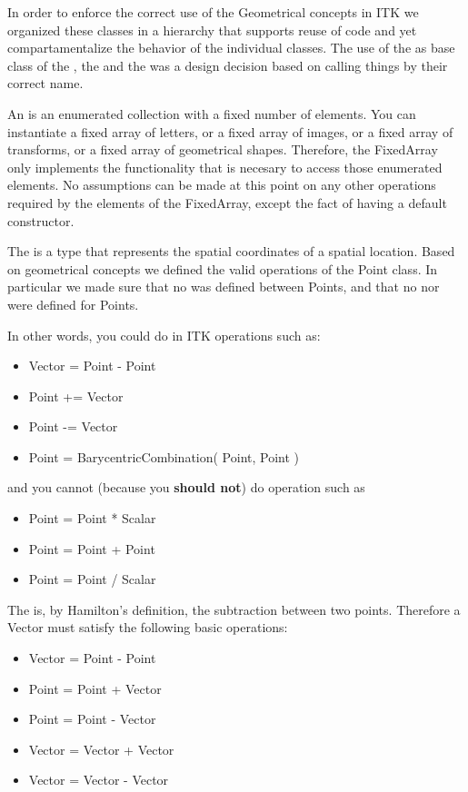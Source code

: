 In order to enforce the correct use of the Geometrical concepts in ITK we
organized these classes in a hierarchy that supports reuse of code and yet
compartamentalize the behavior of the individual classes.  The use of the
 as base class of the , the 
and the  was a design decision based on calling things
by their correct name.

An  is an enumerated collection with a fixed number of
elements. You can instantiate a fixed array of letters, or a fixed array of
images, or a fixed array of transforms, or a fixed array of geometrical shapes.
Therefore, the FixedArray only implements the functionality that is necesary to
access those enumerated elements. No assumptions can be made at this point on
any other operations required by the elements of the FixedArray, except the
fact of having a default constructor.

The  is a type that represents the spatial coordinates of a
spatial location. Based on geometrical concepts we defined the valid operations
of the Point class. In particular we made sure that no  was
defined between Points, and that no  nor
 were defined for Points.

In other words, you could do in ITK operations such as:

\begin{itemize}
\item Vector  = Point - Point
\item Point  +=  Vector
\item Point  -=  Vector
\item Point  = BarycentricCombination( Point, Point )
\end{itemize}

and you cannot (because you \textbf{should not}) do operation such as

\begin{itemize}
\item Point = Point * Scalar    
\item Point = Point + Point    
\item Point = Point / Scalar  
\end{itemize}

The  is, by Hamilton's definition, the subtraction between two
points. Therefore a Vector must satisfy the following basic operations:

\begin{itemize}
\item Vector = Point - Point
\item Point  = Point + Vector
\item Point  = Point - Vector
\item Vector = Vector + Vector
\item Vector = Vector - Vector
\end{itemize}

